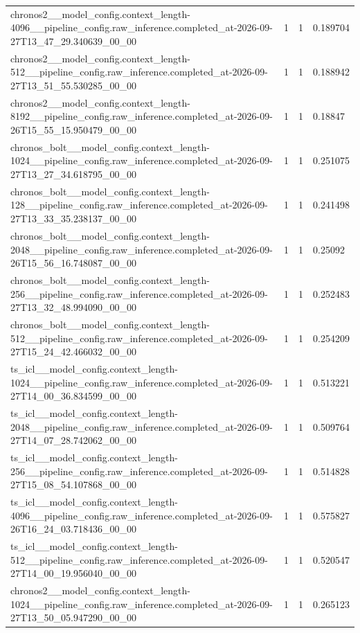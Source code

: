 \begin{tabular}{llll}
chronos2\_\_model\_config.context\_length-4096\_\_pipeline\_config.raw\_inference.completed\_at-2026-09-27T13\_47\_29.340639\_00\_00 & 1 & 1 & 0.189704 \\
chronos2\_\_model\_config.context\_length-512\_\_pipeline\_config.raw\_inference.completed\_at-2026-09-27T13\_51\_55.530285\_00\_00 & 1 & 1 & 0.188942 \\
chronos2\_\_model\_config.context\_length-8192\_\_pipeline\_config.raw\_inference.completed\_at-2026-09-26T15\_55\_15.950479\_00\_00 & 1 & 1 & 0.18847 \\
chronos\_bolt\_\_model\_config.context\_length-1024\_\_pipeline\_config.raw\_inference.completed\_at-2026-09-27T13\_27\_34.618795\_00\_00 & 1 & 1 & 0.251075 \\
chronos\_bolt\_\_model\_config.context\_length-128\_\_pipeline\_config.raw\_inference.completed\_at-2026-09-27T13\_33\_35.238137\_00\_00 & 1 & 1 & 0.241498 \\
chronos\_bolt\_\_model\_config.context\_length-2048\_\_pipeline\_config.raw\_inference.completed\_at-2026-09-26T15\_56\_16.748087\_00\_00 & 1 & 1 & 0.25092 \\
chronos\_bolt\_\_model\_config.context\_length-256\_\_pipeline\_config.raw\_inference.completed\_at-2026-09-27T13\_32\_48.994090\_00\_00 & 1 & 1 & 0.252483 \\
chronos\_bolt\_\_model\_config.context\_length-512\_\_pipeline\_config.raw\_inference.completed\_at-2026-09-27T15\_24\_42.466032\_00\_00 & 1 & 1 & 0.254209 \\
ts\_icl\_\_model\_config.context\_length-1024\_\_pipeline\_config.raw\_inference.completed\_at-2026-09-27T14\_00\_36.834599\_00\_00 & 1 & 1 & 0.513221 \\
ts\_icl\_\_model\_config.context\_length-2048\_\_pipeline\_config.raw\_inference.completed\_at-2026-09-27T14\_07\_28.742062\_00\_00 & 1 & 1 & 0.509764 \\
ts\_icl\_\_model\_config.context\_length-256\_\_pipeline\_config.raw\_inference.completed\_at-2026-09-27T15\_08\_54.107868\_00\_00 & 1 & 1 & 0.514828 \\
ts\_icl\_\_model\_config.context\_length-4096\_\_pipeline\_config.raw\_inference.completed\_at-2026-09-26T16\_24\_03.718436\_00\_00 & 1 & 1 & 0.575827 \\
ts\_icl\_\_model\_config.context\_length-512\_\_pipeline\_config.raw\_inference.completed\_at-2026-09-27T14\_00\_19.956040\_00\_00 & 1 & 1 & 0.520547 \\
chronos2\_\_model\_config.context\_length-1024\_\_pipeline\_config.raw\_inference.completed\_at-2026-09-27T13\_50\_05.947290\_00\_00 & 1 & 1 & 0.265123 \\

\end{tabular}
